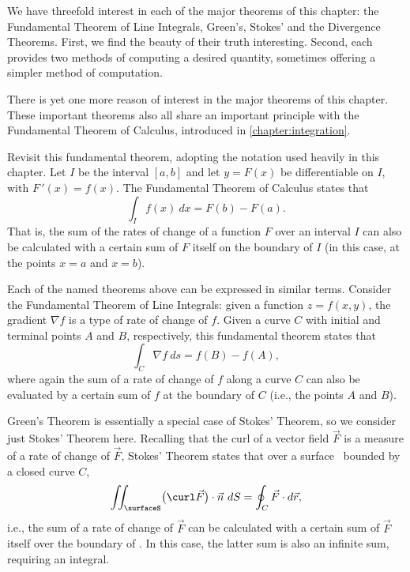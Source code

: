 We have threefold interest in each of the major theorems of this chapter: the Fundamental Theorem of Line Integrals, Green's, Stokes' and the Divergence Theorems. First, we find the beauty of their truth interesting. Second, each provides two methods of computing a desired quantity, sometimes offering a simpler method of computation. 


There is yet one more reason of interest in the major theorems of this chapter. %
These important theorems also all share an important principle with the Fundamental Theorem of Calculus, introduced in \autoref{chapter:integration}. 

Revisit this fundamental theorem, adopting the notation used heavily in this chapter. Let $I$ be the interval $[a,b]$ and let $y=F(x)$ be differentiable on $I$, with $F\,'(x) = f(x)$. The Fundamental Theorem of Calculus states that 
\[\int_I f(x)\ dx = F(b) - F(a).\]
That is, the sum of the rates of change of a function $F$ over an interval $I$ can also be calculated with a certain sum of $F$ itself on the boundary of $I$ (in this case, at the points $x=a$ and $x=b$).

Each of the named theorems above can be expressed in similar terms. Consider the Fundamental Theorem of Line Integrals: given a function $z=f(x,y)$, the gradient $\nabla f$ is a type of rate of change of $f$. Given a curve $C$ with initial and terminal points $A$ and $B$, respectively, this fundamental theorem states that 
\[\int_C \nabla f\ ds = f(B) - f(A),\]
where again the sum of a rate of change of $f$ along a curve $C$ can also be evaluated by a certain sum of $f$ at the boundary of $C$ (i.e., the points $A$ and $B$).

Green's Theorem is essentially a special case of Stokes' Theorem, so we consider just Stokes' Theorem here. Recalling that the curl of a vector field $\vec F$ is a measure of a rate of change of $\vec F$, Stokes' Theorem states that over a surface \surfaceS\ bounded by a closed curve $C$,
\[
\iint_\surfaceS \bigl(\curl \vec F\bigr)\cdot \vec n\ dS = \oint_C \vec F\cdot d\vec r,
\]
i.e., the sum of a rate of change of $\vec F$ can be calculated with a certain sum of $\vec F$ itself over the boundary of \surfaceS. In this case, the latter sum is also an infinite sum, requiring an integral. 

